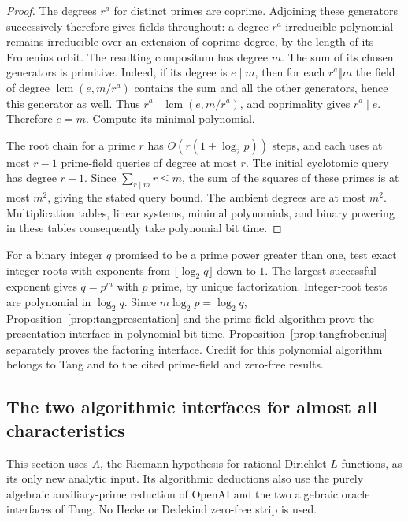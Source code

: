 \documentclass[11pt]{article}
\theoremstyle{definition}
\theoremstyle{remark}
\begin{document}
\begin{proof}
The degrees $r^a$ for distinct primes are coprime. Adjoining these
generators successively therefore gives fields throughout: a
degree-$r^a$ irreducible polynomial remains irreducible over an
extension of coprime degree, by the length of its Frobenius orbit.
The resulting compositum has degree $m$. The sum of its chosen
generators is primitive. Indeed, if its degree is $e\mid m$, then
for each $r^a\Vert m$ the field of degree
$\operatorname{lcm}(e,m/r^a)$ contains the sum and all the other
generators, hence this generator as well. Thus
$r^a\mid\operatorname{lcm}(e,m/r^a)$, and coprimality gives
$r^a\mid e$. Therefore $e=m$. Compute its minimal polynomial.

The root chain for a prime $r$ has
$O(r(1+\log_2p))$ steps, and each uses at most $r-1$ prime-field
queries of degree at most $r$. The initial cyclotomic query has
degree $r-1$. Since $\sum_{r\mid m}r\leq m$, the sum of the
squares of these primes is at most $m^2$, giving the stated query
bound. The ambient degrees are at most $m^2$. Multiplication tables,
linear systems, minimal polynomials, and binary powering in these
tables consequently take polynomial bit time.
\end{proof}

For a binary integer $q$ promised to be a prime power greater than
one, test exact integer roots with exponents from
$\lfloor\log_2q\rfloor$ down to $1$. The largest successful
exponent gives $q=p^m$ with $p$ prime, by unique factorization.
Integer-root tests are polynomial in $\log_2q$. Since
$m\log_2p=\log_2q$, Proposition~\ref{prop:tangpresentation} and
the prime-field algorithm prove the presentation interface in
polynomial bit time. Proposition~\ref{prop:tangfrobenius} separately
proves the factoring interface. Credit for this polynomial algorithm
belongs to Tang and to the cited prime-field and zero-free results.

\subsection{The two algorithmic interfaces for almost all characteristics}
\label{sec:almost-all-12r}

This section uses \(A\), the Riemann hypothesis for rational Dirichlet
\(L\)-functions, as its only new analytic input. Its algorithmic deductions
also use the purely algebraic auxiliary-prime reduction of OpenAI and
the two algebraic oracle interfaces of Tang. No Hecke or Dedekind
zero-free strip is used.
\end{document}
